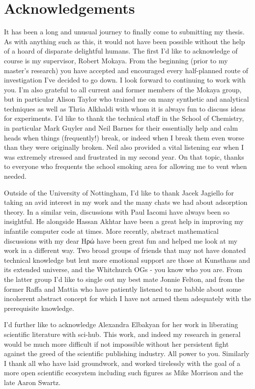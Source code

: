 \cleardoublepage

\chapter*{Acknowledgements}

It has been a long and unusual journey to finally come to submitting my thesis. As with anything such as this, it would not have been possible without the help of a hoard of disparate delightful humans. The first I'd like to acknowledge of course is my supervisor, Robert Mokaya. From the beginning (prior to my master's research) you have accepted and encouraged every half-planned route of investigation I've decided to go down. I look forward to continuing to work with you. I'm also grateful to all current and former members of the Mokaya group, but in particular Alison Taylor who trained me on many synthetic and analytical techniques as well as Thria Alkhaldi with whom it is always fun to discuss ideas for experiments. I'd like to thank the technical staff in the School of Chemistry, in particular Mark Guyler and Neil Barnes for their essentially help and calm heads when things (frequently!) break, or indeed when I break them even worse than they were originally broken. Neil also provided a vital listening ear when I was extremely stressed and frustrated in my second year. On that topic, thanks to everyone who frequents the school smoking area for allowing me to vent when needed.

Outside of the University of Nottingham, I'd like to thank Jacek Jagiello for taking an avid interest in my work and the many chats we had about adsorption theory. In a similar vein, discussions with Paul Iacomi have always been so insightful. He alongside Hassan Akhtar have been a great help in improving my infantile computer code at times. More recently, abstract mathematical discussions with my dear \textgreek{Ηρώ} have been great fun and helped me look at my work in a different way. Two broad groups of friends that may not have donated technical knowledge but lent more emotional support are those at Kunsthaus and its extended universe, and the Whitchurch OGs - you know who you are. From the latter group I'd like to single out my best mate Jonnie Felton, and from the former Raffa and Mattia who have patiently listened to me babble about some incoherent abstract concept for which I have not armed them adequately with the prerequisite knowledge.

I'd further like to acknowledge Alexandra Elbakyan for her work in liberating scientific literature with sci-hub. This work, and indeed my research in general would be much more difficult if not impossible without her persistent fight against the greed of the scientific publishing industry. All power to you. Similarly I thank all who have laid groundwork, and worked tirelessly with the goal of a more open scientific ecosystem including such figures as Mike Morrison and the late Aaron Swartz.

